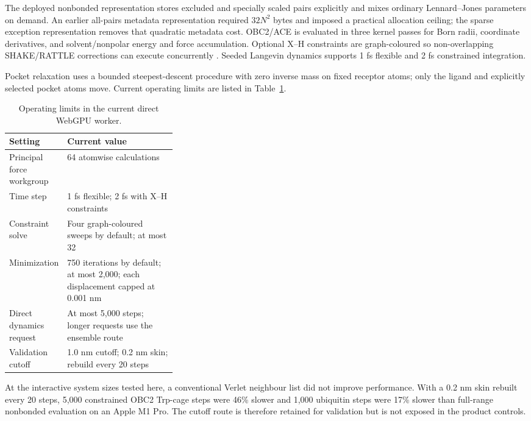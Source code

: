 \documentclass[11pt]{article}
\begin{document}
\begin{small}
The deployed nonbonded representation stores excluded and specially scaled pairs explicitly and mixes ordinary Lennard--Jones parameters on demand. An earlier all-pairs metadata representation required $32N^2$ bytes and imposed a practical allocation ceiling; the sparse exception representation removes that quadratic metadata cost. OBC2/ACE is evaluated in three kernel passes for Born radii, coordinate derivatives, and solvent/nonpolar energy and force accumulation. Optional X--H constraints are graph-coloured so non-overlapping SHAKE/RATTLE corrections can execute concurrently \citep{ryckaert1977shake,andersen1983rattle}. Seeded Langevin dynamics supports 1 fs flexible and 2 fs constrained integration.

Pocket relaxation uses a bounded steepest-descent procedure with zero inverse mass on fixed receptor atoms; only the ligand and explicitly selected pocket atoms move. Current operating limits are listed in Table~\ref{tab:appA_webgpu_limits}.

\begin{table}[htbp]
\centering\small
\caption{Operating limits in the current direct WebGPU worker.}
\label{tab:appA_webgpu_limits}
\begin{tabularx}{0.95\linewidth}{@{}p{0.32\linewidth}X@{}}
\toprule
\textbf{Setting} & \textbf{Current value}\\
\midrule
Principal force workgroup & 64 atomwise calculations\\
Time step & 1 fs flexible; 2 fs with X--H constraints\\
Constraint solve & Four graph-coloured sweeps by default; at most 32\\
Minimization & 750 iterations by default; at most 2,000; each displacement capped at 0.001 nm\\
Direct dynamics request & At most 5,000 steps; longer requests use the ensemble route\\
Validation cutoff & 1.0 nm cutoff; 0.2 nm skin; rebuild every 20 steps\\
\bottomrule
\end{tabularx}
\end{table}

At the interactive system sizes tested here, a conventional Verlet neighbour list did not improve performance. With a 0.2 nm skin rebuilt every 20 steps, 5,000 constrained OBC2 Trp-cage steps were 46\% slower and 1,000 ubiquitin steps were 17\% slower than full-range nonbonded evaluation on an Apple M1 Pro. The cutoff route is therefore retained for validation but is not exposed in the product controls.


\end{small}
\end{document}
